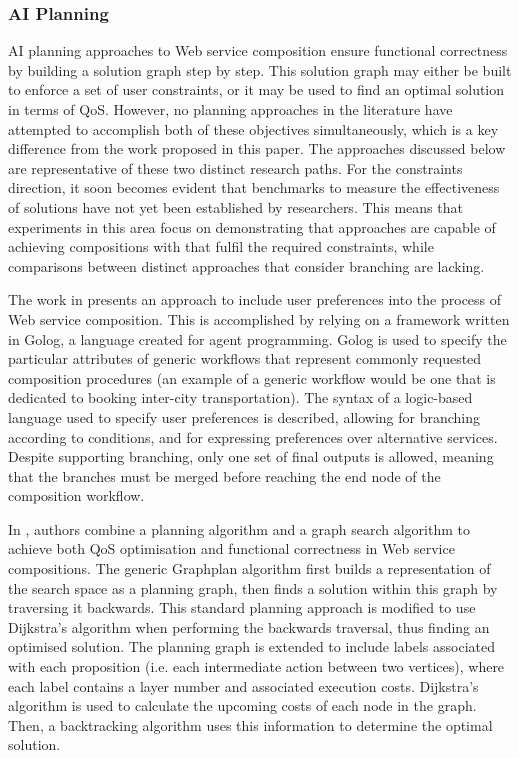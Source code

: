 \documentclass[conference]{IEEEtran}
\begin{document}
\subsubsection{AI Planning}
AI planning approaches to Web service composition ensure functional correctness by building a solution graph step by step. This solution graph may either be built to
enforce a set of user constraints, or it may be used to find an optimal solution in terms of QoS. However, no planning approaches in the literature have attempted to accomplish
both of these objectives simultaneously, which is a key difference from the work proposed in this paper. The approaches discussed below are representative of these two distinct research paths. For the constraints direction, it soon becomes evident that benchmarks to measure the effectiveness of solutions have not yet been established by researchers. This means that experiments in this area focus on demonstrating that approaches are capable of achieving compositions with that fulfil the required constraints, while comparisons between distinct approaches that consider branching are lacking. 

The work in \cite{sohrabi2009web} presents an approach to include user preferences into the process of Web service composition. This is
accomplished by relying on a framework written in Golog, a language created for agent programming. Golog is used
to specify the particular attributes of generic workflows that represent commonly requested composition procedures
(an example of a generic workflow would be one that is dedicated to booking inter-city transportation).
The syntax of a logic-based language used to specify user preferences is described, allowing for
branching according to conditions, and for expressing preferences over alternative services. Despite supporting branching, only one set of final outputs is allowed, meaning that the branches must be merged before reaching the end node of the composition workflow.

In \cite{chen2014qos}, authors combine a planning algorithm and a graph search algorithm to achieve both QoS optimisation and functional correctness in Web service compositions. The
generic Graphplan algorithm first builds a representation of the search space as a planning graph, then finds a solution within this graph by traversing it backwards. This
standard planning approach is modified to use Dijkstra's algorithm when performing the backwards traversal, thus finding an optimised solution. The planning graph
is extended to include labels associated with each proposition (i.e. each intermediate action between two vertices), where each label contains a layer number and
associated execution costs. Dijkstra's algorithm is used to calculate the upcoming costs of each node in the graph. Then, a backtracking algorithm uses this
information to determine the optimal solution.
\end{document}
